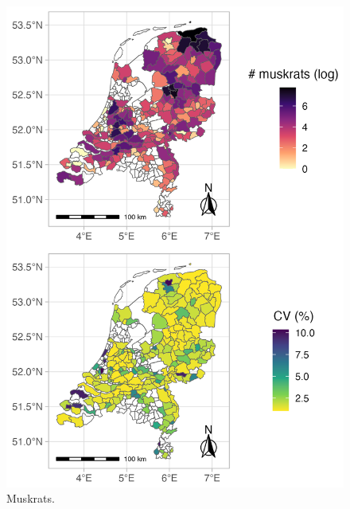 \documentclass[
  11pt,
  a4paper,
]{article}
\begin{document}
\clearpage

\newpage

\begin{figure}[b]

{\centering \includegraphics[width=0.95\linewidth]{muskrats} 

}

\caption{Muskrats.}\label{fig:muskrats}
\end{figure}
\end{document}
